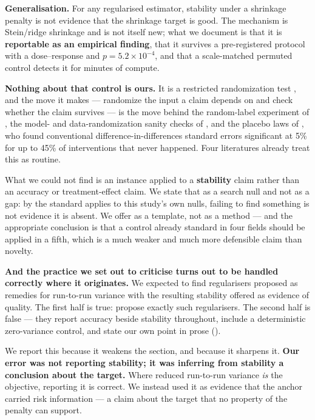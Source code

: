 \textbf{Generalisation.} For any regularised estimator, stability under a shrinkage penalty is not
evidence that the shrinkage target is good. The mechanism is Stein/ridge shrinkage and is not
itself new; what we document is that it is \textbf{reportable as an empirical finding}, that it
survives a pre-registered protocol with a dose--response and \(p = 5.2 \times 10^{-4}\), and that a
scale-matched permuted control detects it for minutes of compute.

\textbf{Nothing about that control is ours.} It is a restricted randomization test \citep{fisher1935design,pitman1937significance,ojala2010permutation}, and the move it makes --- randomize the input a claim depends
on and check whether the claim survives --- is the move behind the random-label experiment of
\citet{zhang2017understanding}, the model- and data-randomization sanity checks of \citet{adebayo2018sanity},
and the placebo laws of \citet{bertrand2004how}, who found conventional
difference-in-differences standard errors significant at 5\% for up to 45\% of interventions that
never happened. Four literatures already treat this as routine.

What we could not find is an instance applied to a \textbf{stability} claim rather than an accuracy
or treatment-effect claim. We state that as a search null and not as a gap: by the standard 
applies to this study's own nulls, failing to find something is not evidence it is absent. We
offer  as a template, not as a method --- and the appropriate conclusion is that a control
already standard in four fields should be applied in a fifth, which is a much weaker and much
more defensible claim than novelty.

\textbf{And the practice we set out to criticise turns out to be handled correctly where it
originates.} We expected to find regularisers proposed as remedies for run-to-run variance with
the resulting stability offered as evidence of quality. The first half is true: \citet{bhojanapalli2021reproducibility} propose exactly such regularisers. The second half is false --- they report accuracy
beside stability throughout, include a deterministic zero-variance control, and state our own
 point in prose ().

We report this because it weakens the section, and because it sharpens it. \textbf{Our error was not
reporting stability; it was inferring from stability a conclusion about the target.} Where
reduced run-to-run variance \emph{is} the objective, reporting it is correct. We instead used it as
evidence that the anchor carried risk information --- a claim about the target that no property of
the penalty can support.

